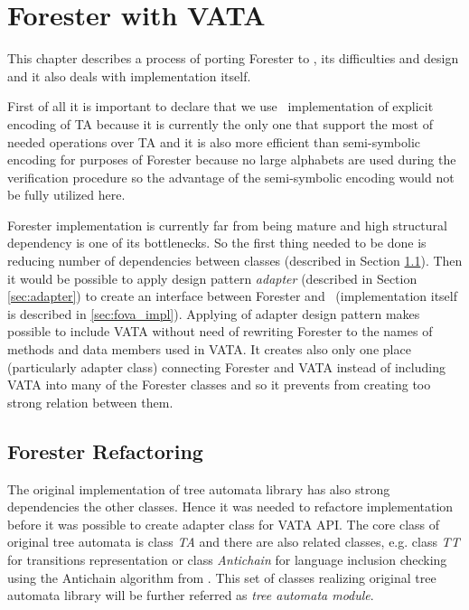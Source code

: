 \chapter{Forester with VATA}
\label{ch:fova}

This chapter describes a process of porting Forester to \vata, its difficulties and design and it also deals with implementation
itself.

First of all it is important to declare that we use \vata\ implementation of explicit encoding of TA because
it is currently the only one that support the most of needed operations over TA and it is also more efficient than
semi-symbolic encoding for purposes of Forester because no large alphabets are used during the verification procedure
so the advantage of the semi-symbolic encoding would not be fully utilized here.

Forester implementation is currently far from being mature and high structural dependency is
one of its bottlenecks.
So the first thing needed to be done is reducing number of dependencies between classes (described in Section \ref{sec:forester_prep}).
Then it would be possible to apply design pattern \emph{adapter} \cite{gamma95} (described in Section \ref{sec:adapter}) to create
an interface between Forester and \vata\ (implementation itself is described in \ref{sec:fova_impl}).
Applying of adapter design pattern makes possible to include VATA without need of rewriting
Forester to the names of methods and data members used in VATA.
It creates also only one place (particularly adapter class) connecting Forester and VATA instead of
including VATA into many of the Forester classes and so it prevents from creating too strong relation between them.

\section{Forester Refactoring}
\label{sec:forester_prep}

The original implementation of tree automata library has also strong dependencies
the other classes.
Hence it was needed to refactore implementation before it was possible to create adapter class for VATA API.
The core class of original tree automata is class \emph{TA} and there are also related classes,
e.g. class \emph{TT} for transitions representation or class \emph{Antichain} for language inclusion checking using the Antichain algorithm from \cite{tacas10}.
This set of classes realizing original tree automata library will be further referred as \emph{tree automata module}.

